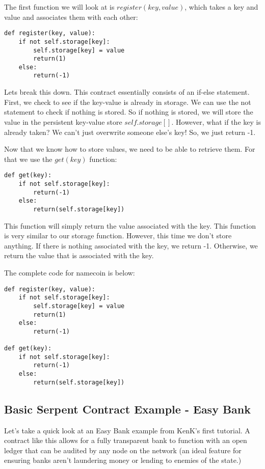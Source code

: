 \documentclass[10pt,twocolumn,letterpaper]{article}
\begin{document}
The first function we will look at is $register(key, value)$, which takes a key and value and associates them with each other:

\begin{verbatim}
def register(key, value):
	if not self.storage[key]:
		self.storage[key] = value
		return(1)
	else:
		return(-1)
\end{verbatim}

Lets break this down. This contract essentially consists of an if-else statement. First, we check to see if the key-value is already in storage. We can use the not statement to check if nothing is stored. So if nothing is stored, we will store the value in the persistent key-value store $self.storage[]$. However, what if the key is already taken? We can't just overwrite someone else's key! So, we just return -1. 

Now that we know how to store values, we need to be able to retrieve them. For that we use the $get(key)$ function:

\begin{verbatim}
def get(key):
	if not self.storage[key]:
		return(-1)
	else:
		return(self.storage[key])
\end{verbatim}

This function will simply return the value associated with the key. This function is very similar to our storage function. However, this time we don't store anything. If there is nothing associated with the key, we return -1. Otherwise, we return the value that is associated with the key.

The complete code for namecoin is below:

\begin{mdframed}
\begin{verbatim}
def register(key, value):
	if not self.storage[key]:
		self.storage[key] = value
		return(1)
	else:
		return(-1)

def get(key):
	if not self.storage[key]:
		return(-1)
	else:
		return(self.storage[key])
\end{verbatim}
\end{mdframed}

\subsection{Basic Serpent Contract Example - Easy Bank}
Let's take a quick look at an Easy Bank example from KenK's first tutorial. A contract like this allows for a fully transparent bank to function with an open ledger that can be audited by any node on the network (an ideal feature for ensuring banks aren't laundering money or lending to enemies of the state.)
\end{document}
